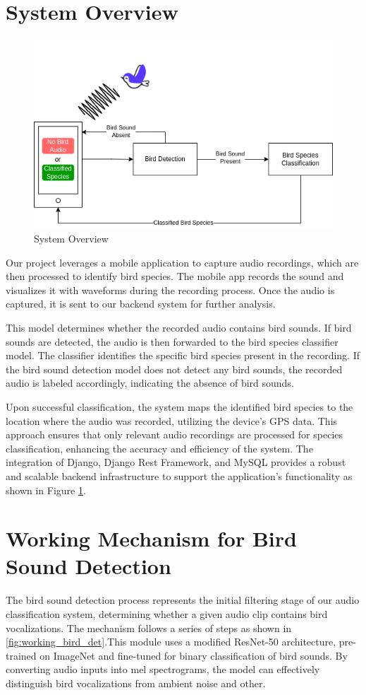 \section{System Overview}
\begin{figure}[h!]
    \centering
    \includegraphics[scale=0.65]{images/System Overview.png}
    \caption{System Overview}\label{fig:system_overview}
\end{figure}
Our project leverages a mobile application to capture audio recordings, which
are then processed to identify bird species. The mobile app records the sound
and visualizes it with waveforms during the recording process. Once the audio
is captured, it is sent to our backend system for further analysis.

This model determines whether
the recorded audio contains bird sounds. If bird sounds are detected, the audio
is then forwarded to the bird species classifier model. The classifier
identifies the specific bird species present in the recording. If the bird sound detection model does not detect any bird
sounds, the recorded audio is labeled accordingly, indicating the absence of
bird sounds.

Upon successful classification, the system maps the identified bird species to
the location where the audio was recorded, utilizing the device's GPS data.
This approach ensures that only relevant audio recordings are processed for
species classification, enhancing the accuracy and efficiency of the system.
The integration of Django, Django Rest Framework, and MySQL provides a robust
and scalable backend infrastructure to support the application's functionality
as shown in Figure \ref{fig:system_overview}.
\\
\section{Working Mechanism for Bird Sound Detection}
      The bird sound detection process represents the initial filtering stage of our audio classification system, determining whether a given audio clip contains bird vocalizations. The mechanism follows a series of steps as shown in \ref{fig:working_bird_det}.This module uses a modified ResNet-50 architecture, pre-trained on ImageNet and fine-tuned for binary classification of bird sounds. By converting audio inputs into mel spectrograms, the model can effectively distinguish bird vocalizations from ambient noise and other.

